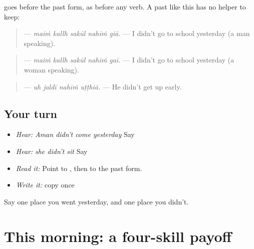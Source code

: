 \begin{grammarlens}[title={Grammar Lens: \pa{ਨਹੀਂ} before the past}]
\textbf{} goes before the past form, as before any verb. A past like this has no helper to keep:

\begin{quote}
\textbf{    } — \emph{maiṁ kallh sakūl nahīṁ giā.} — I didn't go to school yesterday (a man speaking).
\end{quote}

\begin{quote}
\textbf{    } — \emph{maiṁ kallh sakūl nahīṁ gaī.} — I didn't go to school yesterday (a woman speaking).
\end{quote}

\begin{quote}
\textbf{   } — \emph{uh jaldī nahīṁ uṭṭhiā.} — He didn't get up early.
\end{quote}
\end{grammarlens}

\subsection*{Your turn}
\begin{itemize}
\raggedright
  \item \emph{Hear:} \emph{Aman didn't come yesterday} Say \textbf{   }
  \item \emph{Hear:} \emph{she didn't sit} Say \textbf{  }
  \item \emph{Read it:} \textbf{    } Point to \textbf{}, then to the past form.
  \item \emph{Write it:} copy \textbf{ } once
\end{itemize}

\begin{tcolorbox}[breakable,colback=teal!4,colframe=teal!35!black,title={Before you move on}]
Say one place you went yesterday, and one place you didn't.
\end{tcolorbox}
\section[\texorpdfstring{\pa{ਮੈਂ} \pa{ਸਵੇਰੇ} \pa{ਜਲਦੀ} \pa{ਉੱਠਿਆ।} (maiṁ savere …)}{ਮੈਂ ਸਵੇਰੇ ਜਲਦੀ ਉੱਠਿਆ। (maiṁ savere …)}]{This morning: a four-skill payoff}

